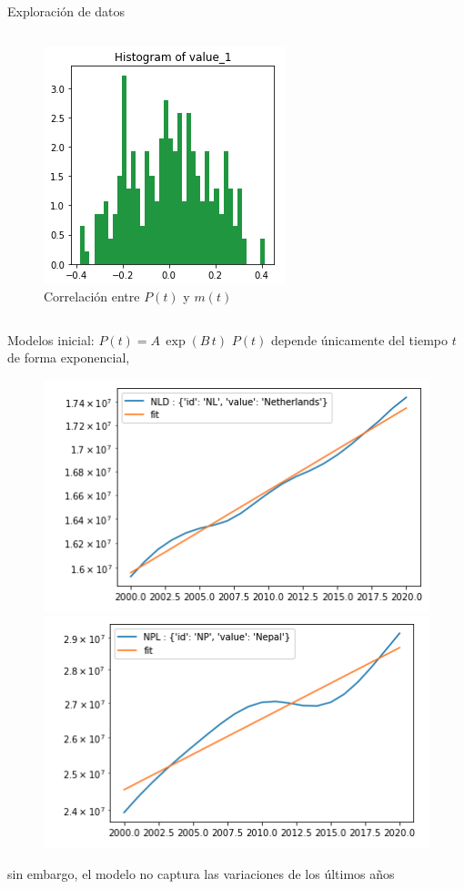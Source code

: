 \documentclass[10pt]{beamer}
\begin{document}
\begin{frame}{Exploración de datos}
\begin{columns}
\begin{column}{0.65\textwidth}
\begin{figure}
\centering
     \includegraphics[scale=0.3]{img/6.png}
     \caption{Correlación entre $P(t)$ y $m(t)$}
     \end{figure}
\end{column}
\end{columns}
\end{frame}

\begin{frame}{Modelos inicial: $P(t) = A\, \exp(B\,t)$ }
$P(t)$ depende únicamente del tiempo $t$ de forma exponencial, 
\begin{figure}
\includegraphics[scale=0.35]{img/7.png}
\includegraphics[scale=0.35]{img/8.png}
\end{figure}
sin embargo, el modelo no captura las variaciones de los últimos años
\end{frame}
\end{document}
